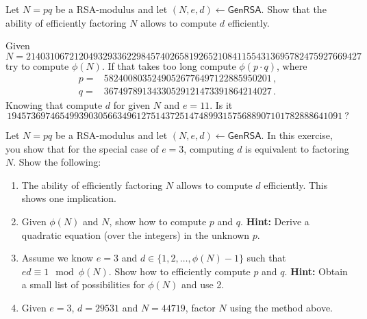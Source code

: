 \documentclass[a4paper,10pt,landscape,twocolumn]{scrartcl}
\begin{document}
\begin{exercise}[RSA]
\begin{subex}
Let $N=pq$ be a RSA-modulus and let
  $(N,e,d) \leftarrow \mathsf{GenRSA}$. 
Show that the ability of efficiently factoring $N$ allows to compute $d$
  efficiently.
  
  Given 
  \begin{equation*}
  N=2140310672120493293362298457402658192652108411554313695782475927669427
  \end{equation*}
  try to compute $\phi(N)$. If that takes too long compute $\phi(p\cdot q)$, where 
  \begin{align*}
  p=&58240080352490526776497122885950201 \, ,\\
  q=&36749789134330529121473391864214027 \, .
  \end{align*}
  Knowing that compute $d$ for given $N$ and $e=11$. Is it 
  \begin{equation*}
  1945736974654993903056634961275143725147489931575688907101782888641091 \  ?
  \end{equation*}
\end{subex}

\begin{subex}
Let $N=pq$ be a RSA-modulus and let
 $(N,e,d) \leftarrow \mathsf{GenRSA}$. In this exercise, you show
 that for the special case of $e=3$, computing $d$ is equivalent to
 factoring $N$. Show the following:
 \begin{enumerate}
 \item The ability of efficiently factoring $N$ allows to compute $d$
 efficiently. This shows one implication.
 \item Given $\phi(N)$ and $N$, show how to compute $p$ and $q$. 
\textbf{Hint:} Derive a quadratic equation (over the integers) in the
   unknown $p$.
   \item Assume we know $e=3$ and $d \in \{1,2,\ldots,\phi(N)-1\}$ such
   that $ed \equiv 1 \mod \phi(N)$. Show how to efficiently compute
   $p$ and $q$. \textbf{Hint:} Obtain a small list of possibilities for
   $\phi(N)$ and use 2.
   \item Given $e=3$, $d=29531$ and $N=44719$, factor $N$ using the
 method above.
 \end{enumerate}
\end{subex}
\end{exercise}
\end{document}

